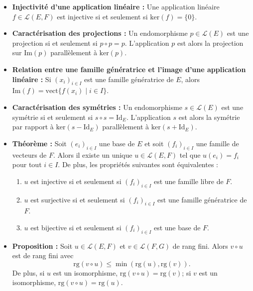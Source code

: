\documentclass{article}
\begin{document}
\begin{itemize}[label=$\ast$]
\item \textbf{Injectivité d'une application linéaire :} Une application linéaire \(f \in \mathcal{L}(E, F)\) est injective si et seulement si \(\text{ker}(f) = \{0\}\).

\item \textbf{Caractérisation des projections :} Un endomorphisme \(p \in \mathcal{L}(E)\) est une projection si et seulement si \(p \circ p = p\). L'application \(p\) est alors la projection sur \(\text{Im}(p)\) parallèlement à \(\text{ker}(p)\).

\item \textbf{Relation entre une famille génératrice et l'image d'une application linéaire :} Si \((x_i)_{i \in I}\) est une famille génératrice de \(E\), alors \(\text{Im}(f) = \text{vect}\{f(x_i) \; | \; i \in I\}\).

\item \textbf{Caractérisation des symétries :} Un endomorphisme \(s \in \mathcal{L}(E)\) est une symétrie si et seulement si \(s \circ s = \text{Id}_E\). L'application \(s\) est alors la symétrie par rapport à \(\text{ker}(s - \text{Id}_E)\) parallèlement à \(\text{ker}(s + \text{Id}_E)\).

\item \textbf{Théorème :} Soit \((e_i)_{i \in I}\) une base de \(E\) et soit \((f_i)_{i \in I}\) une famille de vecteurs de \(F\). Alors il existe un unique \(u \in \mathcal{L}(E, F)\) tel que \(u(e_i) = f_i\) pour tout \(i \in I\). De plus, les propriétés suivantes sont équivalentes :
\begin{enumerate}
    \item \(u\) est injective si et seulement si \((f_i)_{i \in I}\) est une famille libre de \(F\).
    \item \(u\) est surjective si et seulement si \((f_i)_{i \in I}\) est une famille génératrice de \(F\).
    \item \(u\) est bijective si et seulement si \((f_i)_{i \in I}\) est une base de \(F\).
\end{enumerate}

\item \textbf{Proposition :} Soit \(u \in \mathcal{L}(E, F)\) et \(v \in \mathcal{L}(F, G)\) de rang fini. Alors \(v \circ u\) est de rang fini avec \[ \text{rg}(v \circ u) \leq \min(\text{rg}(u), \text{rg}(v)). \] De plus, si \(u\) est un isomorphisme, \(\text{rg}(v \circ u) = \text{rg}(v)\); si \(v\) est un isomorphisme, \(\text{rg}(v \circ u) = \text{rg}(u)\).


\end{itemize}
\end{document}
